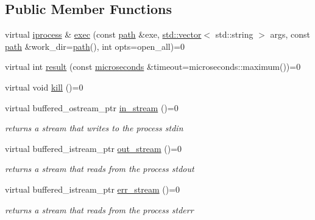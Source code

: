 \subsection*{Public Member Functions}
\begin{DoxyCompactItemize}
\item 
virtual \mbox{\hyperlink{classfc_1_1iprocess}{iprocess}} \& \mbox{\hyperlink{classfc_1_1iprocess_a3f0415eda607b44ed96732c354f198e0}{exec}} (const \mbox{\hyperlink{classfc_1_1path}{path}} \&exe, \mbox{\hyperlink{classstd_1_1vector}{std\+::vector}}$<$ std\+::string $>$ args, const \mbox{\hyperlink{classfc_1_1path}{path}} \&work\+\_\+dir=\mbox{\hyperlink{classfc_1_1path}{path}}(), int opts=open\+\_\+all)=0
\item 
virtual int \mbox{\hyperlink{classfc_1_1iprocess_abe1c8fb231fe682868561a1193361ce9}{result}} (const \mbox{\hyperlink{classfc_1_1microseconds}{microseconds}} \&timeout=microseconds\+::maximum())=0
\item 
virtual void \mbox{\hyperlink{classfc_1_1iprocess_ab8f2c418018f1722ae821334bfd6c0f8}{kill}} ()=0
\item 
\mbox{\label{classfc_1_1iprocess_a89bdbe5f0ec7a46dcdd1a24121f4e876}} 
virtual buffered\+\_\+ostream\+\_\+ptr \mbox{\hyperlink{classfc_1_1iprocess_a89bdbe5f0ec7a46dcdd1a24121f4e876}{in\+\_\+stream}} ()=0
\begin{DoxyCompactList}\small\item\em returns a stream that writes to the process\textquotesingle{} stdin \end{DoxyCompactList}\item 
\mbox{\label{classfc_1_1iprocess_a44d94c426ed7402470f6ad0a969e1a7e}} 
virtual buffered\+\_\+istream\+\_\+ptr \mbox{\hyperlink{classfc_1_1iprocess_a44d94c426ed7402470f6ad0a969e1a7e}{out\+\_\+stream}} ()=0
\begin{DoxyCompactList}\small\item\em returns a stream that reads from the process\textquotesingle{} stdout \end{DoxyCompactList}\item 
\mbox{\label{classfc_1_1iprocess_a4a4c3a21dd58acae5cb1dca26bae0a4f}} 
virtual buffered\+\_\+istream\+\_\+ptr \mbox{\hyperlink{classfc_1_1iprocess_a4a4c3a21dd58acae5cb1dca26bae0a4f}{err\+\_\+stream}} ()=0
\begin{DoxyCompactList}\small\item\em returns a stream that reads from the process\textquotesingle{} stderr \end{DoxyCompactList}\end{DoxyCompactItemize}


